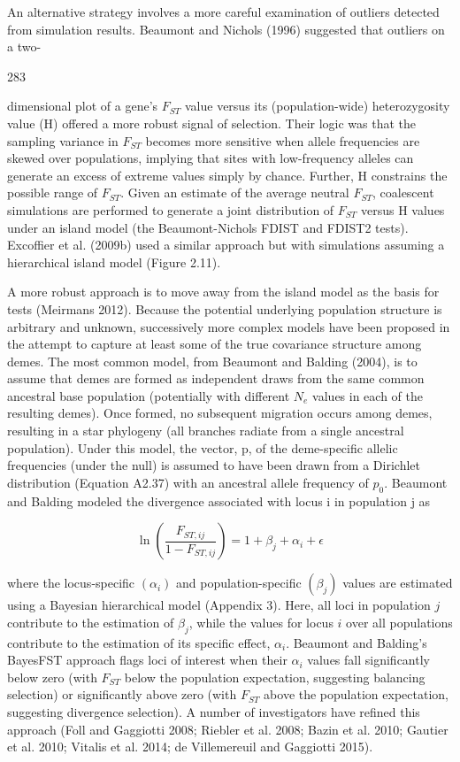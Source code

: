 \documentclass{article}
\begin{document}
An alternative strategy involves a more careful examination of outliers detected from simulation results. Beaumont and Nichols (1996) suggested that outliers on a two-

283

dimensional plot of a gene's  $ F_{ST} $ value versus its (population-wide) heterozygosity value (H) offered a more robust signal of selection. Their logic was that the sampling variance in  $ F_{ST} $ becomes more sensitive when allele frequencies are skewed over populations, implying that sites with low-frequency alleles can generate an excess of extreme values simply by chance. Further, H constrains the possible range of  $ F_{ST} $. Given an estimate of the average neutral  $ F_{ST} $, coalescent simulations are performed to generate a joint distribution of  $ F_{ST} $ versus H values under an island model (the Beaumont-Nichols FDIST and FDIST2 tests). Excoffier et al. (2009b) used a similar approach but with simulations assuming a hierarchical island model (Figure 2.11).

A more robust approach is to move away from the island model as the basis for tests (Meirmans 2012). Because the potential underlying population structure is arbitrary and unknown, successively more complex models have been proposed in the attempt to capture at least some of the true covariance structure among demes. The most common model, from Beaumont and Balding (2004), is to assume that demes are formed as independent draws from the same common ancestral base population (potentially with different  $ N_{e} $ values in each of the resulting demes). Once formed, no subsequent migration occurs among demes, resulting in a star phylogeny (all branches radiate from a single ancestral population). Under this model, the vector, p, of the deme-specific allelic frequencies (under the null) is assumed to have been drawn from a Dirichlet distribution (Equation A2.37) with an ancestral allele frequency of  $ p_{0} $. Beaumont and Balding modeled the divergence associated with locus i in population j as

\begin{equation}
\ln\left(\frac{F_{ST,ij}}{1-F_{ST,ij}}\right)=1+\beta_{j}+\alpha_{i}+\epsilon
\tag{9.11}
\label{eq:9_11}
\end{equation}

where the locus-specific $(\alpha_i)$ and population-specific $(\beta_j)$ values are estimated using a Bayesian hierarchical model (Appendix 3). Here, all loci in population $j$ contribute to the estimation of $\beta_j$, while the values for locus $i$ over all populations contribute to the estimation of its specific effect, $\alpha_i$. Beaumont and Balding's BayesFST approach flags loci of interest when their $\alpha_i$ values fall significantly below zero (with $F_{ST}$ below the population expectation, suggesting balancing selection) or significantly above zero (with $F_{ST}$ above the population expectation, suggesting divergence selection). A number of investigators have refined this approach (Foll and Gaggiotti 2008; Riebler et al. 2008; Bazin et al. 2010; Gautier et al. 2010; Vitalis et al. 2014; de Villemereuil and Gaggiotti 2015).
\end{document}
